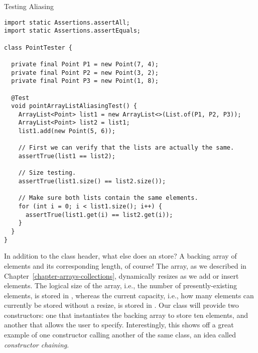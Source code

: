 \begin{cl}[]{Testing  Aliasing}
\begin{lstlisting}[language=MyJava]
import static Assertions.assertAll;
import static Assertions.assertEquals;

class PointTester {

  private final Point P1 = new Point(7, 4);
  private final Point P2 = new Point(3, 2);
  private final Point P3 = new Point(1, 8);

  @Test
  void pointArrayListAliasingTest() {
    ArrayList<Point> list1 = new ArrayList<>(List.of(P1, P2, P3));
    ArrayList<Point> list2 = list1;
    list1.add(new Point(5, 6));

    // First we can verify that the lists are actually the same.
    assertTrue(list1 == list2);

    // Size testing.
    assertTrue(list1.size() == list2.size());

    // Make sure both lists contain the same elements.
    for (int i = 0; i < list1.size(); i++) {
      assertTrue(list1.get(i) == list2.get(i));
    }
  }
}
\end{lstlisting}
\end{cl}


In addition to the class header, what else does an  store? A backing array of elements and its corresponding length, of course! The array, as we described in Chapter~\ref{chapter-arrays-collections}, dynamically resizes as we add or insert elements. The logical size of the array, i.e., the number of presently-existing elements, is stored in , whereas the current capacity, i.e., how many elements can currently be stored without a resize, is stored in . Our class will provide two constructors: one that instantiates the backing array to store ten elements, and another that allows the user to specify. Interestingly, this shows off a great example of one constructor calling another of the same class, an idea called \textit{constructor chaining}. 

